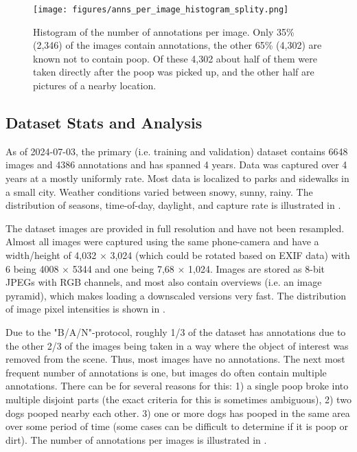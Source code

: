 \documentclass[10pt,twocolumn,letterpaper]{article}
\begin{document}
\begin{figure}[ht]
\centering
\texttt{[image: figures/anns\_per\_image\_histogram\_splity.png]}
\caption[]{
    Histogram of the number of annotations per image. 
    Only 35\% (2,346) of the images contain annotations, the other 65\% (4,302)
    are known not to contain poop. Of these 4,302 about half of them were taken
    directly after the poop was picked up, and the other half are pictures of a
    nearby location.
}
\label{fig:AnnotsPerImage}
\end{figure}


\subsection{Dataset Stats and Analysis}

As of 2024-07-03, the primary (i.e. training and validation) dataset contains
6648 images and 4386 annotations and has spanned 4 years. Data was captured
over 4 years at a mostly uniformly rate.  Most data is localized to parks and
sidewalks in a small city.  Weather conditions varied between snowy, sunny,
rainy.  The distribution of seasons, time-of-day, daylight, and capture rate is
illustrated in .

The dataset images are provided in full resolution and have not been resampled.
Almost all images were captured using the same phone-camera and have a
width/height of 4,032 $\times$ 3,024 (which could be rotated based on EXIF data) with 6
being 4008  $\times$ 5344 and one being 7,68 $\times$ 1,024. Images are stored as 8-bit JPEGs
with RGB channels, and most also contain overviews (i.e.  an image pyramid),
which makes loading a downscaled versions very fast.  The distribution of image
pixel intensities is shown in .


Due to the "B/A/N"-protocol, roughly 1/3 of the dataset has annotations due to
the other 2/3 of the images being taken in a way where the object of interest
was removed from the scene. Thus, most images have no annotations. The next
most frequent number of annotations is one, but images do often contain
multiple annotations.
There can be for several reasons for this:
    1) a single poop broke into multiple disjoint parts (the exact criteria for this is sometimes ambiguous), 
    2) two dogs pooped nearby each other. 
    3) one or more dogs has pooped in the same area over some period of
       time (some cases can be difficult to determine if it is poop or dirt).
The number of annotations per images is illustrated in
.
\end{document}
